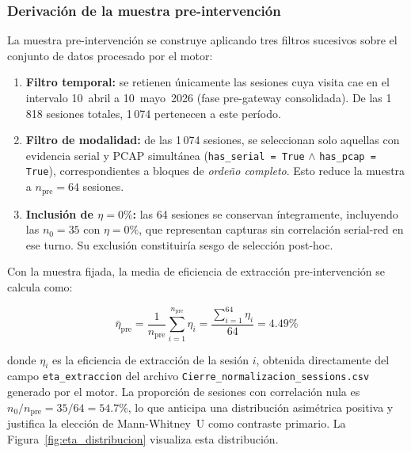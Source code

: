 \subsubsection*{Derivación de la muestra pre-intervención}

La muestra pre-intervención se construye aplicando tres filtros sucesivos sobre el conjunto de datos procesado por el motor:

\begin{enumerate}
    \item \textbf{Filtro temporal:} se retienen únicamente las sesiones cuya visita cae en el intervalo 10~abril a 10~mayo~2026 (fase pre-gateway consolidada). De las 1\,818 sesiones totales, 1\,074 pertenecen a este período.
    \item \textbf{Filtro de modalidad:} de las 1\,074 sesiones, se seleccionan solo aquellas con evidencia serial y \ac{PCAP} simultánea (\texttt{has\_serial = True} $\land$ \texttt{has\_pcap = True}), correspondientes a bloques de \textit{ordeño completo}. Esto reduce la muestra a $n_{\text{pre}} = 64$ sesiones.
    \item \textbf{Inclusión de $\eta = 0\%$:} las 64 sesiones se conservan íntegramente, incluyendo las $n_0 = 35$ con $\eta = 0\%$, que representan capturas sin correlación serial-red en ese turno. Su exclusión constituiría sesgo de selección post-hoc.
\end{enumerate}

Con la muestra fijada, la media de eficiencia de extracción pre-intervención se calcula como:

\begin{equation}
    \bar{\eta}_{\text{pre}} = \frac{1}{n_{\text{pre}}} \sum_{i=1}^{n_{\text{pre}}} \eta_i = \frac{\sum_{i=1}^{64} \eta_i}{64} = 4.49\%
    \label{eq:eta_pre_media}
\end{equation}

donde $\eta_i$ es la eficiencia de extracción de la sesión $i$, obtenida directamente del campo \texttt{eta\_extraccion} del archivo \texttt{Cierre\_normalizacion\_sessions.csv} generado por el motor. La proporción de sesiones con correlación nula es $n_0/n_{\text{pre}} = 35/64 = 54.7\%$, lo que anticipa una distribución asimétrica positiva y justifica la elección de Mann-Whitney~U como contraste primario. La Figura~\ref{fig:eta_distribucion} visualiza esta distribución.

